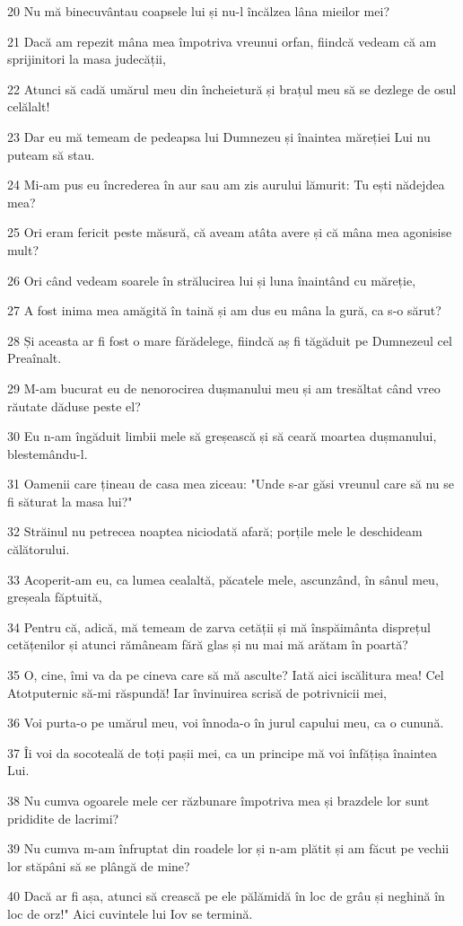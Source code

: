 \par 20 Nu mă binecuvântau coapsele lui și nu-l încălzea lâna mieilor mei?
\par 21 Dacă am repezit mâna mea împotriva vreunui orfan, fiindcă vedeam că am sprijinitori la masa judecății,
\par 22 Atunci să cadă umărul meu din încheietură și brațul meu să se dezlege de osul celălalt!
\par 23 Dar eu mă temeam de pedeapsa lui Dumnezeu și înaintea măreției Lui nu puteam să stau.
\par 24 Mi-am pus eu încrederea în aur sau am zis aurului lămurit: Tu ești nădejdea mea?
\par 25 Ori eram fericit peste măsură, că aveam atâta avere și că mâna mea agonisise mult?
\par 26 Ori când vedeam soarele în strălucirea lui și luna înaintând cu măreție,
\par 27 A fost inima mea amăgită în taină și am dus eu mâna la gură, ca s-o sărut?
\par 28 Și aceasta ar fi fost o mare fărădelege, fiindcă aș fi tăgăduit pe Dumnezeul cel Preaînalt.
\par 29 M-am bucurat eu de nenorocirea dușmanului meu și am tresăltat când vreo răutate dăduse peste el?
\par 30 Eu n-am îngăduit limbii mele să greșească și să ceară moartea dușmanului, blestemându-l.
\par 31 Oamenii care țineau de casa mea ziceau: "Unde s-ar găsi vreunul care să nu se fi săturat la masa lui?"
\par 32 Străinul nu petrecea noaptea niciodată afară; porțile mele le deschideam călătorului.
\par 33 Acoperit-am eu, ca lumea cealaltă, păcatele mele, ascunzând, în sânul meu, greșeala făptuită,
\par 34 Pentru că, adică, mă temeam de zarva cetății și mă înspăimânta disprețul cetățenilor și atunci rămâneam fără glas și nu mai mă arătam în poartă?
\par 35 O, cine, îmi va da pe cineva care să mă asculte? Iată aici iscălitura mea! Cel Atotputernic să-mi răspundă! Iar învinuirea scrisă de potrivnicii mei,
\par 36 Voi purta-o pe umărul meu, voi înnoda-o în jurul capului meu, ca o cunună.
\par 37 Îi voi da socoteală de toți pașii mei, ca un principe mă voi înfățișa înaintea Lui.
\par 38 Nu cumva ogoarele mele cer răzbunare împotriva mea și brazdele lor sunt prididite de lacrimi?
\par 39 Nu cumva m-am înfruptat din roadele lor și n-am plătit și am făcut pe vechii lor stăpâni să se plângă de mine?
\par 40 Dacă ar fi așa, atunci să crească pe ele pălămidă în loc de grâu și neghină în loc de orz!" Aici cuvintele lui Iov se termină.

